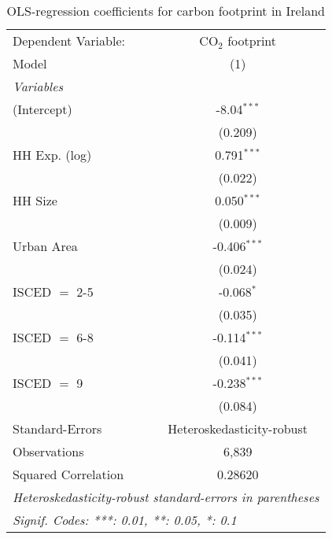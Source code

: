 
\begin{table}[htbp!]
   \centering
   \small
   \begin{adjustbox}{width = 1\textwidth, max height = 0.95\textheight, center}
      \begin{threeparttable}[b]
         \caption{\label{tab:OLS_2_IRL} OLS-regression coefficients for carbon footprint in Ireland}
         \begin{tabular}{lc}
            \tabularnewline \midrule \midrule
            Dependent Variable: & CO$_{2}$ footprint\\  
            Model               & (1)\\  
            \midrule
            \emph{Variables}\\
            (Intercept)         & -8.04$^{***}$\\   
                                & (0.209)\\   
            HH Exp. (log)       & 0.791$^{***}$\\   
                                & (0.022)\\   
            HH Size             & 0.050$^{***}$\\   
                                & (0.009)\\   
            Urban Area          & -0.406$^{***}$\\   
                                & (0.024)\\   
            ISCED $=$ 2-5       & -0.068$^{*}$\\   
                                & (0.035)\\   
            ISCED $=$ 6-8       & -0.114$^{***}$\\   
                                & (0.041)\\   
            ISCED $=$ 9         & -0.238$^{***}$\\   
                                & (0.084)\\   
            \midrule 
            Standard-Errors     & Heteroskedasticity-robust \\   
            Observations        & 6,839\\  
            Squared Correlation & 0.28620\\  
            \midrule \midrule
            \multicolumn{2}{l}{\emph{Heteroskedasticity-robust standard-errors in parentheses}}\\
            \multicolumn{2}{l}{\emph{Signif. Codes: ***: 0.01, **: 0.05, *: 0.1}}\\
         \end{tabular}
         

\end{threeparttable}
\end{adjustbox}
\end{table}
